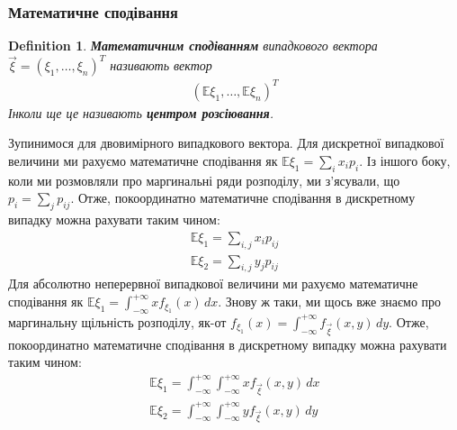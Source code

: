 \documentclass[a4paper, 10pt]{article}
\theoremstyle{theoremdd}
\newtheorem{definition}[theorem]{Definition}
\begin{document}
\subsubsection{Математичне сподівання}
\begin{definition}
\textbf{Математичним сподіванням} випадкового вектора $\vec{\xi} = (\xi_1,\dots,\xi_n)^T$ називають вектор
\begin{align*}
(\mathbb{E}\xi_1,\dots,\mathbb{E}\xi_n)^T
\end{align*}
Інколи ще це називають \textbf{центром розсіювання}.
\end{definition}
\noindent
Зупинимося для двовимірного випадкового вектора. Для дискретної випадкової величини ми рахуємо математичне сподівання як $\displaystyle\mathbb{E}\xi_1 = \sum_i x_i p_i$. Із іншого боку, коли ми розмовляли про маргинальні ряди розподілу, ми з'ясували, що $p_i = \displaystyle\sum_j p_{ij}$. Отже, покоординатно математичне сподівання в дискретному випадку можна рахувати таким чином:
\begin{align*}
\mathbb{E}\xi_1 = \sum_{i,j} x_i p_{ij} \\
\mathbb{E}\xi_2 = \sum_{i,j} y_j p_{ij}
\end{align*}
Для абсолютно неперервної випадкової величини ми рахуємо математичне сподівання як $\displaystyle\mathbb{E}\xi_1 = \int_{-\infty}^{+\infty} x f_{\xi_1}(x)\,dx$. Знову ж таки, ми щось вже знаємо про маргинальну щільність розподілу, як-от $f_{\xi_1}(x) = \displaystyle\int_{-\infty}^{+\infty} f_{\vec{\xi}}(x,y)\,dy$. Отже, покоординатно математичне сподівання в дискретному випадку можна рахувати таким чином:
\begin{align*}
\mathbb{E}\xi_1 = \int_{-\infty}^{+\infty} \int_{-\infty}^{+\infty} x f_{\vec{\xi}}(x,y)\,dx \\
\mathbb{E}\xi_2 = \int_{-\infty}^{+\infty} \int_{-\infty}^{+\infty} y f_{\vec{\xi}}(x,y)\,dy
\end{align*}
\end{document}
